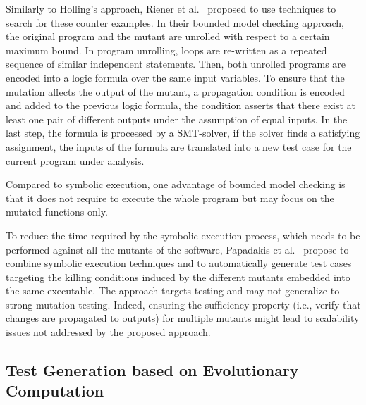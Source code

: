 

Similarly to Holling's approach, Riener et al.~\cite{riener2011test} proposed to use  techniques to search for these counter examples.
In their bounded model checking approach, the original program and the mutant are unrolled with respect to a certain maximum bound. In program unrolling, loops are re-written as a repeated sequence of similar independent statements. Then, both unrolled programs are encoded into a logic formula over the same input variables. To ensure that the mutation affects the output of the mutant, a propagation condition is encoded and added to the previous logic formula, the condition asserts that there exist at least one pair of different outputs under the assumption of equal inputs. In the last step, the formula is processed by a SMT-solver, if the solver finds a satisfying assignment, the inputs of the formula are translated into a new test case for the current program under analysis.


Compared to symbolic execution, one advantage of bounded model checking is that it does not require to execute the whole program but may focus on the mutated functions only.

To reduce the time required by the symbolic execution process, which needs to be performed against all the mutants of the software, Papadakis et al.~\cite{papadakis2011automatically, papadakis2010towards} propose to combine symbolic execution techniques and  to automatically generate test cases targeting the killing conditions induced by the different mutants embedded into the same executable. The approach targets  testing and may not generalize to strong mutation testing. Indeed, ensuring the sufficiency property (i.e., verify that changes are propagated to outputs) for multiple mutants might lead to scalability issues not addressed by the proposed approach.

\subsection{Test Generation based on Evolutionary Computation}

